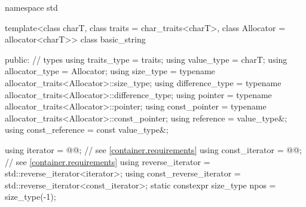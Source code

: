 %
%
%
%
%
%
%
%
%
%
%
%
%
%
\begin{codeblock}
namespace std {
  template<class charT, class traits = char_traits<charT>,
           class Allocator = allocator<charT>>
  class basic_string {
  public:
    // types
    using traits_type            = traits;
    using value_type             = charT;
    using allocator_type         = Allocator;
    using size_type              = typename allocator_traits<Allocator>::size_type;
    using difference_type        = typename allocator_traits<Allocator>::difference_type;
    using pointer                = typename allocator_traits<Allocator>::pointer;
    using const_pointer          = typename allocator_traits<Allocator>::const_pointer;
    using reference              = value_type&;
    using const_reference        = const value_type&;

    using iterator               = @@; // see \ref{container.requirements}
    using const_iterator         = @@; // see \ref{container.requirements}
    using reverse_iterator       = std::reverse_iterator<iterator>;
    using const_reverse_iterator = std::reverse_iterator<const_iterator>;
    static constexpr size_type npos = size_type(-1);

}}
\end{codeblock}
